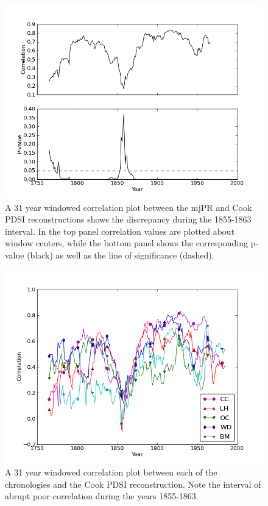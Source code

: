 \begin{figure}
\centering
\includegraphics[width=5in]{figures/reconRunningCorr.png}
\caption{A 31 year windowed correlation plot between the mjPR and Cook PDSI reconstructions shows the discrepancy during the 1855-1863 interval. In the top panel correlation values are plotted about window centers, while the bottom panel shows the corresponding p-value (black) as well as the line of significance (dashed).}
\label{fig:reconRunningCorr}
\end{figure}

\begin{figure}
\centering
\includegraphics[width=5in]{figures/cookPdsiRunningCorr.png}
\caption{A 31 year windowed correlation plot between each of the chronologies and the Cook PDSI reconstruction. Note the interval of abrupt poor correlation during the years 1855-1863.}
\label{fig:cookRunningPdsiCorr}
\end{figure}

